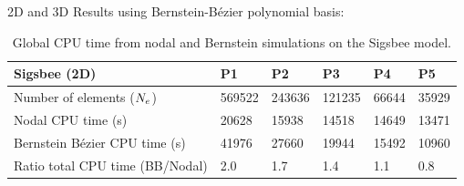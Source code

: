 \begin{frame}[noframenumbering]{2D and 3D Results using Bernstein-Bézier polynomial basis:}
\scriptsize
\vspace{0.5cm}
\begin{table}[H]
    \centering
    \begin{tabular}{|l|l|l|l|l|l|}
    \hline
        \textbf{Sigsbee (2D)} & P1 & P2 & P3 & P4 & P5 \\ \hline
        Number of elements (${N_e}$) & 569522 & 243636 & 121235 & 66644 & 35929 \\ \hline
        Nodal CPU time (s) & 20628 & 15938 & 14518 & 14649 & 13471 \\ \hline
        Bernstein Bézier CPU time (s) & 41976 & 27660 & 19944 & 15492 & 10960 \\ \hline
        Ratio total CPU time (BB/Nodal) & \cellcolor{\myred!30}2.0 & \cellcolor{\myred!30}1.7 & \cellcolor{\myred!30}1.4 & \cellcolor{\myred!30}1.1 & \cellcolor{\mygreen!30}0.8 \\ \hline
    \end{tabular}
    \caption*{Global CPU time from nodal and Bernstein simulations on the Sigsbee model.}
    \label{sigsbee_bb_tab}
\end{table}


\end{frame}


